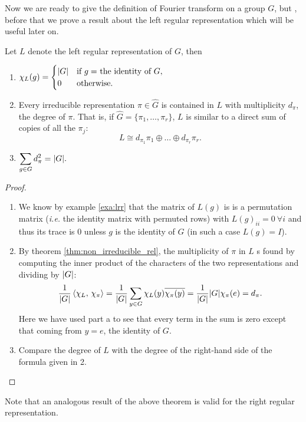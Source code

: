 Now we are ready to give the definition of Fourier transform on a group $G$, but , before that we prove a result about the left regular representation which will be useful later on.
\begin{lemma}
\label{lemma:lrr}
Let $L$ denote the left regular representation of $G$, then
\begin{enumerate}
\item $\displaystyle
\chi_{L}(g)=
\begin{cases}
\lvert G\rvert &\text{if $g=$ the identity of $G$},\\
0	   &\text{otherwise}.
\end{cases}
$
\item Every irreducible representation $\pi \in \hat{G}$ is contained in $L$ with multiplicity $d_\pi$, the degree of $\pi$. That is, if $\hat{G}=\{\pi_1,\dots ,\pi_r\}$, $L$ is similar to a direct sum of copies of all the  $\pi_j$:
\[
L\cong d_{\pi_1}\pi_1\oplus\dots\oplus d_{\pi_r}\pi_r.
\]
\item $\displaystyle\sum_{g\in G}d_{\pi}^2=\lvert G\rvert.$	
\end{enumerate}
\end{lemma}  
\begin{proof}
\begin{enumerate}
\item We know by example \ref{exa:lrr} that the matrix of $L(g)$ is  is a permutation matrix (\emph{i.e.} the identity matrix with permuted rows) with $L(g)_{ii}=0 \ \forall i$ and thus its trace is 0 unless $g$ is the identity of $G$ (in such a case $L(g)=I$).
\item By theorem \ref{thm:non_irreducible_rel}, the multiplicity of $\pi$ in $L$ s found by computing the inner product  of  the  characters  of  the  two  representations  and  dividing  by $\lvert G\rvert$:
\[
\frac{1}{\lvert G\rvert}\braket{\chi_L,\, \chi_\pi}=\frac{1}{\lvert G\rvert}\sum_{y \in G}\chi_L(y) \overline{\chi_\pi(y)}=\frac{1}{\lvert G\rvert}\lvert G\rvert \chi_\pi(e)=d_\pi.
\]
Here  we have used  part  a to  see that  every  term  in  the  sum is  zero  except
that coming from $y=e$, the identity of $G$.
\item Compare the degree of $L$ with the degree of the right-hand side of the formula given in 2.
 

\end{enumerate}
\end{proof}
Note that an analogous result of the above theorem is valid for the right regular representation.
